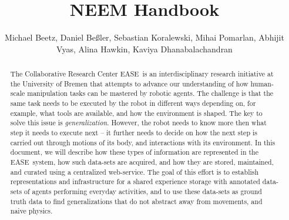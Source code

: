 \documentclass{svmult}
\title*{NEEM Handbook}
\author{
   Michael Beetz,
   Daniel Be{\ss}ler,
   Sebastian Koralewski,
   Mihai Pomarlan,
   Abhijit Vyas,
   Alina Hawkin,
   Kaviya Dhanabalachandran
}
\institute{CRC Everyday Activity Science and Engineering (EASE)\\ University Bremen, Am Fallturm 1, 28359 Bremen\\ \texttt{ai-office@cs.uni-bremen.de}}
\newcommand{\ease}{EASE~}
\begin{document}
\let\oldaddcontentsline\addcontentsline
\def\addcontentsline#1#2#3{}
\maketitle
\def\addcontentsline#1#2#3{\oldaddcontentsline{#1}{#2}{#3}}

\begin{abstract}
The Collaborative Research Center \ease is an interdisciplinary research initiative at the University of Bremen that attempts to advance our understanding of how human-scale manipulation tasks can be mastered by robotic agents.
The challenge is that the same task needs to be executed by the robot in different ways depending on, for example, what tools are available, and how the environment is shaped.
The key to solve this issue is \emph{generalization}.
However, the robot needs to know more then what step it needs to execute next -- it further needs to decide on how the next step is carried out through motions of its body, and interactions with its environment.
In this document, we will describe how these types of information are represented in the \ease system, how such data-sets are acquired, and how they are stored, maintained, and curated using a centralized web-service.
The goal of this effort is to establish representations and infrastructure for a shared experience storage with annotated data-sets of agents performing everyday activities,
and to use these data-sets as ground truth data to find generalizations that do not abstract away from movements, and naive physics.
\end{abstract}

\cleardoublepage
\tableofcontents

\setcounter{page}{0}
\cleardoublepage

%
%

\setcounter{section}{0}


\setcounter{section}{0}


\setcounter{section}{0}


\setcounter{section}{0}


\setcounter{section}{0}


%
%

\cleardoublepage



%
\end{document}
